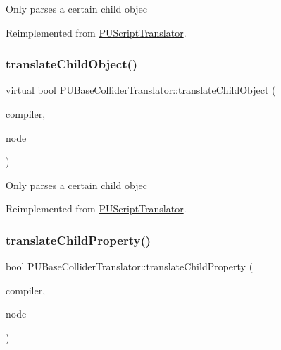 Only parses a certain child objec 

Reimplemented from \hyperlink{classPUScriptTranslator_ab587d01348ae3e678cb700c719b2b113}{P\+U\+Script\+Translator}.

\mbox{\label{classPUBaseColliderTranslator_a23c345d7c8c59fcd788724953fdc3623}} 
\subsubsection{\texorpdfstring{translate\+Child\+Object()}{translateChildObject()}\hspace{0.1cm}{\footnotesize\ttfamily [2/2]}}
{\footnotesize\ttfamily virtual bool P\+U\+Base\+Collider\+Translator\+::translate\+Child\+Object (\begin{DoxyParamCaption}\item[{\hyperlink{classPUScriptCompiler}{P\+U\+Script\+Compiler} $\ast$}]{compiler,  }\item[{\hyperlink{classPUAbstractNode}{P\+U\+Abstract\+Node} $\ast$}]{node }\end{DoxyParamCaption})\hspace{0.3cm}{\ttfamily [virtual]}}

Only parses a certain child objec 

Reimplemented from \hyperlink{classPUScriptTranslator_ab587d01348ae3e678cb700c719b2b113}{P\+U\+Script\+Translator}.

\mbox{\label{classPUBaseColliderTranslator_a4de26b00ae2aa23adfe7de076e7a0888}} 
\subsubsection{\texorpdfstring{translate\+Child\+Property()}{translateChildProperty()}\hspace{0.1cm}{\footnotesize\ttfamily [1/2]}}
{\footnotesize\ttfamily bool P\+U\+Base\+Collider\+Translator\+::translate\+Child\+Property (\begin{DoxyParamCaption}\item[{\hyperlink{classPUScriptCompiler}{P\+U\+Script\+Compiler} $\ast$}]{compiler,  }\item[{\hyperlink{classPUAbstractNode}{P\+U\+Abstract\+Node} $\ast$}]{node }\end{DoxyParamCaption})\hspace{0.3cm}{\ttfamily [virtual]}}

